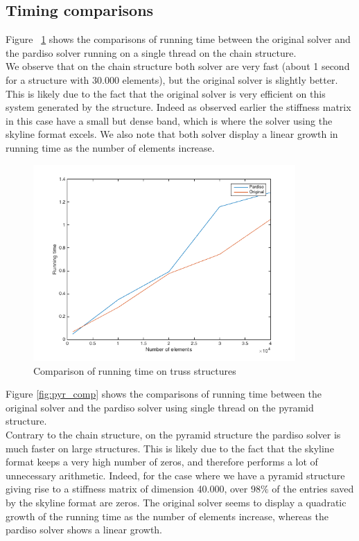 \documentclass[11pt]{article}
\begin{document}
\subsection{Timing comparisons}
Figure  ~\ref {fig:chaincomp} shows  the comparisons of running time between the original solver and the pardiso solver running on a single thread on the chain structure. \\

We observe that on the chain structure both solver are very fast (about 1 second for a structure with 30.000 elements), but the original solver is slightly better.  This is likely due to the fact that the original solver is very efficient on this system generated by the structure. Indeed as observed earlier the stiffness matrix in this case have a small but dense band, which is where the solver using the skyline format excels. We also note that both solver display a linear growth in running time as the number of elements increase.


\begin{figure}[H]
\begin{center}

\includegraphics[width=10cm]{chainplot}
\caption{Comparison of running time on truss structures}
\label{fig:chaincomp}
\end{center}
\end{figure}

Figure \ref{fig:pyr_comp} shows the comparisons of running time between the original solver and the pardiso solver using single thread on the pyramid structure. \\

Contrary to the chain structure, on the pyramid structure the pardiso solver is much faster on large structures. This is likely due to the fact that the skyline format keeps a very high number of zeros, and therefore performs a lot of unnecessary arithmetic. Indeed, for the case where we have a pyramid structure giving rise to a stiffness matrix of dimension 40.000, over $98\%$ of the entries saved by the skyline format are zeros. The original solver seems to display a quadratic growth of the running time as the number of elements increase, whereas the pardiso solver shows a linear growth.
\end{document}
